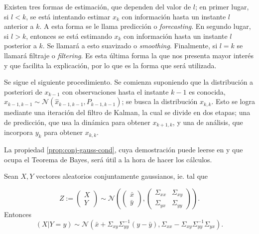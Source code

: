 Existen tres formas de estimación, que dependen del valor de \(l\); en primer lugar, si \(l < k\), se está intentando estimar \(x_k\) con información hasta un instante \(l\) anterior a \(k\). A esta forma se le llama predicción o \textit{forecasting}. En segundo lugar, si \(l>k\), entonces se está estimando \(x_k\) con información hasta un instante \(l\) posterior a \(k\). Se llamará a esto suavizado o \textit{smoothing}. Finalmente, si \(l = k\) se llamará filtraje o \textit{filtering}. Es esta última forma la que nos presenta mayor interés y que facilita la explicación, por lo que es la forma que será utilizada.

Se sigue el siguiente procedimiento. Se comienza suponiendo que la distribución a posteriori de \(x_{k-1}\) con observaciones hasta el instante \(k-1\) es conocida, \(x_{k-1, k-1} \sim \mathcal{N}(\hat{x}_{k-1, k-1}, P_{k-1, k-1})\); se busca la distribución \(x_{k, k}\). Esto se logra mediante una iteración del filtro de Kalman, la cual se divide en dos etapas; una de predicción, que usa la dinámica para obtener \(x_{k+1, k}\), y una de análisis, que incorpora \(y_k\) para obtener \(x_{k, k}\).

La propiedad \ref{prop:conj-gauss-cond}, cuya demostración puede leerse en \cite{Anderson2005} y que ocupa el Teorema de Bayes, será útil a la hora de hacer los cálculos.


\begin{prop}
\label{prop:conj-gauss-cond}
Sean \(X, Y\) vectores aleatorios conjuntamente
gaussianos, ie. tal que

\[
Z := \begin{pmatrix}
X\\
Y
\end{pmatrix} \sim \mathcal{N}\left(
\begin{pmatrix}
\bar{x} \\
\bar{y}
\end{pmatrix}, 
\begin{pmatrix}
\Sigma_{xx} & \Sigma_{xy} \\
\Sigma_{yx} & \Sigma_{yy}
\end{pmatrix}
\right).
\] Entonces \[
(X|Y=y) \sim \mathcal{N} \left( \bar{x} + \Sigma_{xy}\Sigma_{yy}^{-1}(y-\bar{y}),
\Sigma_{xx} - \Sigma_{xy}\Sigma_{yy}^{-1}\Sigma_{yx}
 \right).
\]
\end{prop}


